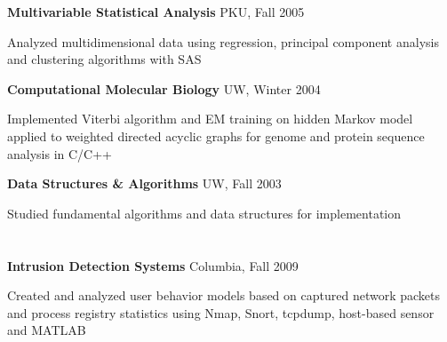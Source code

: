 \documentclass[margin,line]{resume}
\begin{document}
\begin{resume}
    \textbf{Multivariable Statistical Analysis} \hfill PKU, Fall 2005  \vspace{-3mm}\\\vspace{-1mm}%
      \begin{list2}
       \item Analyzed multidimensional data using regression, principal component analysis and clustering algorithms with SAS
      \end{list2}

    \textbf{Computational Molecular Biology} \hfill UW, Winter 2004  \vspace{-3mm}\\\vspace{-1mm}%
      \begin{list2}
      \item Implemented Viterbi algorithm and EM training on hidden Markov model applied to weighted directed acyclic graphs for genome and protein sequence analysis in C/C++ 
      \end{list2}

      

    \textbf{Data Structures \& Algorithms} \hfill UW, Fall 2003 \vspace{-3mm}\\\vspace{-1mm}%
      \begin{list2}
      \item Studied fundamental algorithms and data structures for implementation 
      \end{list2}

      

    \section{\mysidestyle [System]} 

    \textbf{Intrusion Detection Systems} \hfill Columbia, Fall 2009  \vspace{-3mm}\\\vspace{-1mm}%
      \begin{list2}
      \item Created and analyzed user behavior models based on captured network packets and process registry statistics using Nmap, Snort, tcpdump, host-based sensor and MATLAB 
      \end{list2}
      


\end{resume}
\end{document}

